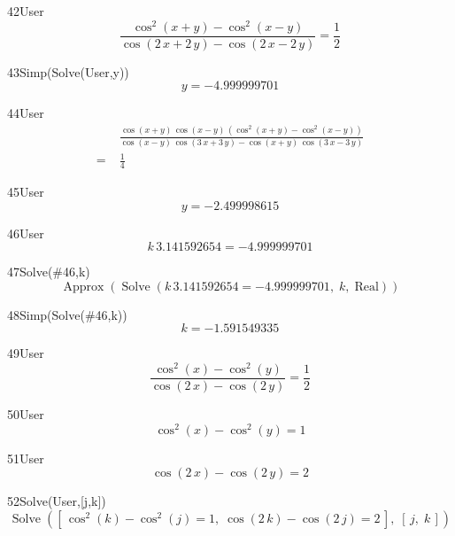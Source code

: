 \begin{espr}{42}{User}{\verificata}
\[
\frac{\cos^{2}\!\left(x + y\right) - \cos^{2}\!\left(x - y\right)}{\cos\!\left(2\, x + 2\, y\right) - \cos\!\left(2\, x - 2\, y\right)} = \frac{1}{2}
\]
\end{espr}
\begin{espr}{43}{Simp(Solve(User,y))}{}
\[
y = -4.999999701
\]
\end{espr}
\begin{espr}{44}{User}{\verificata}
\begin{align*}
& \frac{\cos\!\left(x + y\right)\, \cos\!\left(x - y\right)\, \left(\cos^{2}\!\left(x + y\right) - \cos^{2}\!\left(x - y\right)\right)}{\cos\!\left(x - y\right)\, \cos\!\left(3\, x + 3\, y\right) - \cos\!\left(x + y\right)\, \cos\!\left(3\, x - 3\, y\right)} \\
=\;& \frac{1}{4}
\end{align*}
\end{espr}
\begin{espr}{45}{User}{}
\[
y = -2.499998615
\]
\end{espr}
\begin{espr}{46}{User}{}
\[
k\, 3.141592654 = -4.999999701
\]
\end{espr}
\begin{espr}{47}{Solve(\#46,k)}{}
\[
\operatorname{Approx}\!\left(\operatorname{Solve}\!\left(k\, 3.141592654 = -4.999999701,\; k,\; \mathrm{Real}\right)\right)
\]
\end{espr}
\begin{espr}{48}{Simp(Solve(\#46,k))}{}
\[
k = -1.591549335
\]
\end{espr}
\begin{espr}{49}{User}{\verificata}
\[
\frac{\cos^{2}\!\left(x\right) - \cos^{2}\!\left(y\right)}{\cos\!\left(2\, x\right) - \cos\!\left(2\, y\right)} = \frac{1}{2}
\]
\end{espr}
\begin{espr}{50}{User}{}
\[
\cos^{2}\!\left(x\right) - \cos^{2}\!\left(y\right) = 1
\]
\end{espr}
\begin{espr}{51}{User}{}
\[
\cos\!\left(2\, x\right) - \cos\!\left(2\, y\right) = 2
\]
\end{espr}
\begin{espr}{52}{Solve(User,[j,k])}{}
\[
\operatorname{Solve}\!\left(\left[\, \cos^{2}\!\left(k\right) - \cos^{2}\!\left(j\right) = 1,\; \cos\!\left(2\, k\right) - \cos\!\left(2\, j\right) = 2 \,\right],\; \left[\, j,\; k \,\right]\right)
\]
\end{espr}
